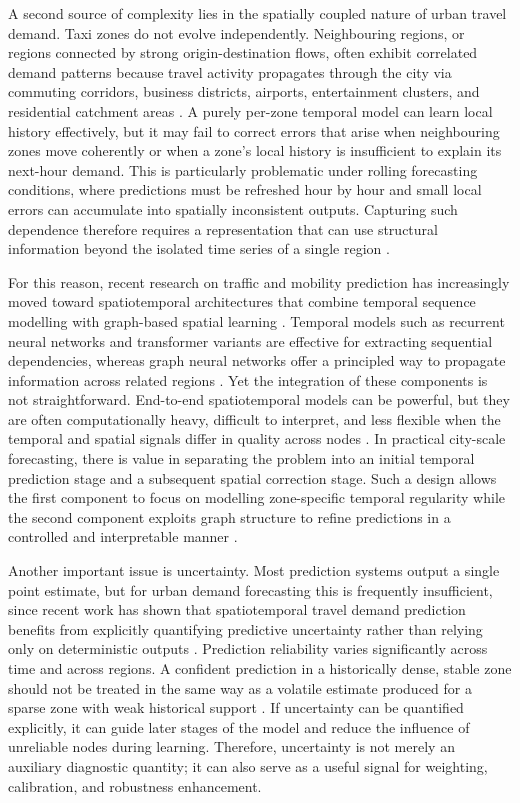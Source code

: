 \documentclass[12pt,a4paper]{report}
\begin{document}
A second source of complexity lies in the spatially coupled nature of urban travel demand. Taxi zones do not evolve independently. Neighbouring regions, or regions connected by strong origin-destination flows, often exhibit correlated demand patterns because travel activity propagates through the city via commuting corridors, business districts, airports, entertainment clusters, and residential catchment areas \cite{xue2020spatiotemporal,ke2021od}. A purely per-zone temporal model can learn local history effectively, but it may fail to correct errors that arise when neighbouring zones move coherently or when a zone's local history is insufficient to explain its next-hour demand. This is particularly problematic under rolling forecasting conditions, where predictions must be refreshed hour by hour and small local errors can accumulate into spatially inconsistent outputs. Capturing such dependence therefore requires a representation that can use structural information beyond the isolated time series of a single region \cite{jiang2022survey}.

For this reason, recent research on traffic and mobility prediction has increasingly moved toward spatiotemporal architectures that combine temporal sequence modelling with graph-based spatial learning \cite{jiang2022survey,fu2024survey}. Temporal models such as recurrent neural networks and transformer variants are effective for extracting sequential dependencies, whereas graph neural networks offer a principled way to propagate information across related regions \cite{jiang2022survey}. Yet the integration of these components is not straightforward. End-to-end spatiotemporal models can be powerful, but they are often computationally heavy, difficult to interpret, and less flexible when the temporal and spatial signals differ in quality across nodes \cite{garcia2023explainability,liu2025review}. In practical city-scale forecasting, there is value in separating the problem into an initial temporal prediction stage and a subsequent spatial correction stage. Such a design allows the first component to focus on modelling zone-specific temporal regularity while the second component exploits graph structure to refine predictions in a controlled and interpretable manner \cite{shao2022d2stgnn}.

Another important issue is uncertainty. Most prediction systems output a single point estimate, but for urban demand forecasting this is frequently insufficient, since recent work has shown that spatiotemporal travel demand prediction benefits from explicitly quantifying predictive uncertainty rather than relying only on deterministic outputs \cite{zhuang2022sparse,wang2024probgnn}. Prediction reliability varies significantly across time and across regions. A confident prediction in a historically dense, stable zone should not be treated in the same way as a volatile estimate produced for a sparse zone with weak historical support \cite{zhuang2022sparse}. If uncertainty can be quantified explicitly, it can guide later stages of the model and reduce the influence of unreliable nodes during learning. Therefore, uncertainty is not merely an auxiliary diagnostic quantity; it can also serve as a useful signal for weighting, calibration, and robustness enhancement.
\end{document}
